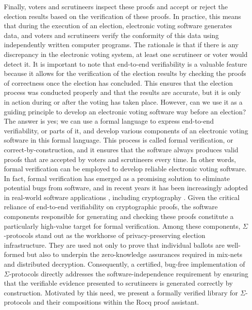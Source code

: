 \documentclass[sigconf,anonymous,review]{acmart}
\begin{document}
Finally, voters and scrutineers inspect these proofs and accept or reject the election results based on 
the verification of these proofs. In practice, this means that during the execution of an election, 
electronic voting software generates data, and voters and scrutineers verify the conformity of 
this data using independently written computer programs. The rationale is that if there is 
any discrepancy in the electronic voting system, at least one scrutineer or voter would detect it.
It is important to note that end-to-end verifiability is a valuable feature because it 
allows for the verification of the election results by checking the proofs of correctness 
once the election has concluded. This ensures that the election process was conducted 
properly and that the results are accurate, but it is only in action during or after the voting has taken place.
However, can we use it as a guiding principle to develop an electronic voting software way before 
an election? The answer is yes; we can use a formal language to express end-to-end verifiability, or parts of 
it, and develop various components of an electronic voting 
software in this formal language. This process is called formal verification, or correct-by-construction,
and it ensures that the software always produces valid proofs that 
are accepted by voters and scrutineers every time. In other words, formal verification
can be employed to develop reliable electronic voting software.
In fact, formal verification has emerged as a promising solution 
to eliminate potential bugs from software, and in recent years it has been increasingly 
adopted in real-world software applications \cite{10.1145/1111037.1111042}, 
including cryptography \cite{8835346,10.1145/3133956.3134043,190894,10.1145/2701415,
10.1145/2660267.2660370,10.1145/3319535.3363211}. Given the critical reliance of end-to-end verifiability on cryptographic proofs, the software components responsible for generating and checking these proofs constitute a particularly high-value target for formal verification. Among these components, $\Sigma$-protocols stand out as the workhorse of privacy-preserving election infrastructure. 
They are used not only to prove that individual ballots are well-formed but also to underpin the zero-knowledge assurances required in mix-nets and distributed decryption. 
Consequently, a certified, bug-free implementation of $\Sigma$-protocols directly addresses the software-independence requirement by ensuring that the verifiable evidence presented to scrutineers is generated correctly by construction.  Motivated by this need, we present a formally verified library for $\Sigma$-protocols and their compositions within the Rocq proof assistant.
\end{document}
